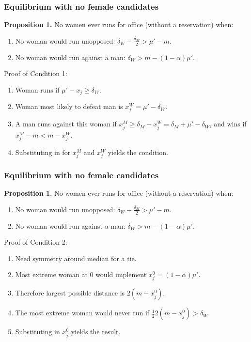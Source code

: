 \documentclass[11pt,aspectratio=169]{beamer}
\begin{document}
\begin{frame}
\frametitle{Equilibrium with no female candidates}

\textbf{Proposition 1.} No women ever runs for office (without a reservation) when: \begin{enumerate}
\item No woman would run unopposed: $\delta_W - \frac{\delta_M}{2} > \mu' - m$.
\item No woman would run against a man: $\delta_W > m - (1-\alpha)\mu'$.
\end{enumerate}

\bigskip



Proof of Condition 1: 
\begin{enumerate}
\item Woman runs if $\mu' - x_j \geq \delta_W$.
\item Woman most likely to defeat man is $x_j^W = \mu'-\delta_W$.
\item A man runs against this woman if $x_j^M \geq \delta_M + x_j^W = \delta_M + \mu' - \delta_W$, and wins if $x_j^M - m < m - x_j^W$.
\item Substituting in for $x_j^M$ and $x_j^W$ yields the condition.
\end{enumerate}

\end{frame}


\begin{frame}\frametitle{Equilibrium with no female candidates}

\textbf{Proposition 1.} No women ever runs for office (without a reservation) when: \begin{enumerate}
\item No woman would run unopposed: $\delta_W - \frac{\delta_M}{2} > \mu' - m$.
\item No woman would run against a man: $\delta_W > m - (1-\alpha)\mu'$.
\end{enumerate}

\bigskip

Proof of Condition 2: 
\begin{enumerate}
\item Need symmetry around median for a tie.
\item Most extreme woman at 0 would implement $x_j^0=(1-\alpha)\mu'$.
\item Therefore largest possible distance is $2(m-x_j^0)$.
\item The most extreme woman would never run if $\frac{1}{2}2(m-x_j^0)>\delta_W$.
\item Substituting in $x_j^0$ yields the result.
\end{enumerate}

\end{frame}
\end{document}
